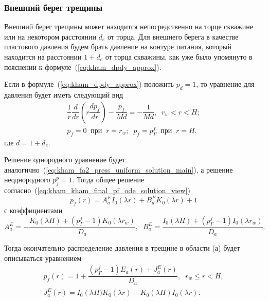 \documentclass{article}
\newcommand{\mysub}[1]{%
  \par\vspace{0.5em}\noindent{\normalsize\underline{#1}}\par\vspace{0.5em}%
}
\begin{document}
\subsubsection{Внешний берег трещины}
Внешний берег трещины может находится непосредственно на торце скважине или на некотором расстоянии $d_e$ от торца. Для внешнего берега в качестве пластового давления будем брать давление на контуре питания, который находится на расстоянии $1+d_e$ от торца скважины, как уже было упомянуто в пояснении к формуле~(\ref{eq:kham_dpdy_approx}).

\mysub{Подобласть (а) $r_w \leq x < H$}
Если в формуле~(\ref{eq:kham_dpdy_approx}) положить $p_d=1$, то уравнение для давления будет иметь следующий вид
\begin{equation}
\displaystyle
\begin{gathered}
\dfrac{1}{r}\dfrac{d}{dr}\left(r\dfrac{d p_f}{dr}\right) - \dfrac{p_f}{Md} = - \dfrac{1}{Md} , \;\; r_w < r < H;    \\[8pt]
p_f = 0 \;\; \text{при} \;\; r = r_w; \;\; p_f = p^f_{\Gamma} \;\; \text{при} \;\; r = H,
\end{gathered}
\label{eq:kham_fract_outer_area_a_press_main}
\end{equation}
где $d = 1 + d_e$.

Решение однородного уравнение будет аналогично~(\ref{eq:kham_fa2_press_uniform_solution_main}), а решение неоднородного $p_f^p = 1$.
Тогда общее решение согласно~(\ref{eq:kham_kham_final_pf_ode_solution_view})
\begin{equation}
\displaystyle
p_f(r) = A_a^E I_0\left(\lambda r\right) + B_a^E K_0\left(\lambda r\right) + 1
\label{eq:kham_fract_outer_pa}
\end{equation}
с коэффициентами
\begin{equation}
\displaystyle
A_a^E = - \dfrac{K_0 \left(\lambda H \right) + \left( p^f_{\Gamma} - 1 \right) K_0 \left( \lambda r_w \right)}{D_a}, \;\;
B_a^E = \dfrac{I_0 \left( \lambda H \right) + \left(p^f_{\Gamma} - 1 \right) I_0 \left(\lambda r_w \right) }{D_a}.
\label{eq:kham_fract_outer_pa_cf_AB}
\end{equation}

Тогда окончательно распределение давления в трещине в области (а) будет описываться уравнением
\begin{equation}
\displaystyle
\begin{gathered}
p_f\left(r\right) = 1 + \dfrac{\left(p^f_{\Gamma}-1\right) E_a \left(r\right) + J_a^E\left(r\right)}{D_a}, \;\; r_w \leq r < H, \\
J_a^E(r) = I_0 \left(\lambda H) K_0 \left(\lambda r\right) - K_0 \left(\lambda H\right) I_0 \left(\lambda r\right).
\end{gathered}
\label{eq:kham_fract_outer_final_sol_pf_radial}
\end{equation}
\end{document}
